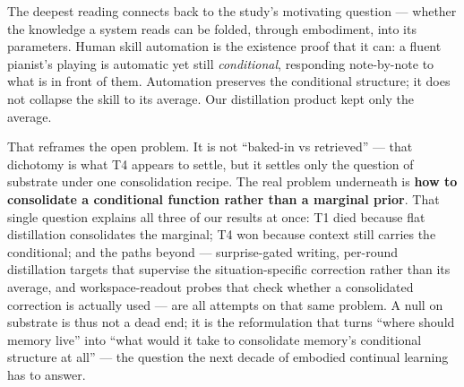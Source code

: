 The deepest reading connects back to the study's motivating question ---
whether the knowledge a system reads can be folded, through embodiment,
into its parameters. Human skill automation is the existence proof that
it can: a fluent pianist's playing is automatic yet still \emph{conditional},
responding note-by-note to what is in front of them. Automation
preserves the conditional structure; it does not collapse the skill to
its average. Our distillation product kept only the average.

That reframes the open problem. It is not ``baked-in vs retrieved'' ---
that dichotomy is what T4 appears to settle, but it settles only the
question of substrate under one consolidation recipe. The real problem
underneath is \textbf{how to consolidate a conditional function rather than a
marginal prior}. That single question explains all three of our
results at once: T1 died because flat distillation consolidates the
marginal; T4 won because context still carries the conditional; and the
paths beyond --- surprise-gated writing, per-round distillation targets
that supervise the situation-specific correction rather than its
average, and workspace-readout probes that check whether a consolidated
correction is actually used --- are all attempts on that same problem.
A null on substrate is thus not a dead end; it is the reformulation
that turns ``where should memory live'' into ``what would it take to
consolidate memory's conditional structure at all'' --- the question the
next decade of embodied continual learning has to answer.
